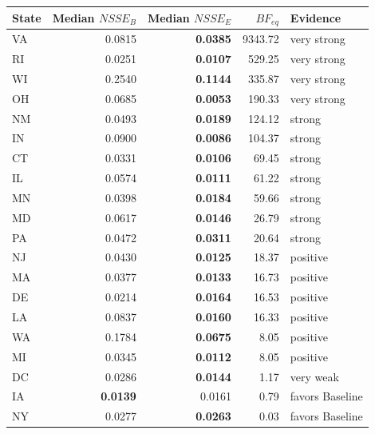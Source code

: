 
\begin{tabular}{lrrrl}
\toprule
State & Median $NSSE_{B}$ & Median $NSSE_{E}$ & $BF_{eq}$ & Evidence\\
\midrule
VA & 0.0815 & \textbf{0.0385} & 9343.72 & very strong\\
RI & 0.0251 & \textbf{0.0107} & 529.25 & very strong\\
WI & 0.2540 & \textbf{0.1144} & 335.87 & very strong\\
OH & 0.0685 & \textbf{0.0053} & 190.33 & very strong\\
NM & 0.0493 & \textbf{0.0189} & 124.12 & strong\\
IN & 0.0900 & \textbf{0.0086} & 104.37 & strong\\
CT & 0.0331 & \textbf{0.0106} & 69.45 & strong\\
IL & 0.0574 & \textbf{0.0111} & 61.22 & strong\\
MN & 0.0398 & \textbf{0.0184} & 59.66 & strong\\
MD & 0.0617 & \textbf{0.0146} & 26.79 & strong\\
PA & 0.0472 & \textbf{0.0311} & 20.64 & strong\\
NJ & 0.0430 & \textbf{0.0125} & 18.37 & positive\\
MA & 0.0377 & \textbf{0.0133} & 16.73 & positive\\
DE & 0.0214 & \textbf{0.0164} & 16.53 & positive\\
LA & 0.0837 & \textbf{0.0160} & 16.33 & positive\\
WA & 0.1784 & \textbf{0.0675} & 8.05 & positive\\
MI & 0.0345 & \textbf{0.0112} & 8.05 & positive\\
DC & 0.0286 & \textbf{0.0144} & 1.17 & very weak\\
IA & \textbf{0.0139} & 0.0161 & 0.79 & favors Baseline\\
NY & 0.0277 & \textbf{0.0263} & 0.03 & favors Baseline\\
\bottomrule
\end{tabular}
